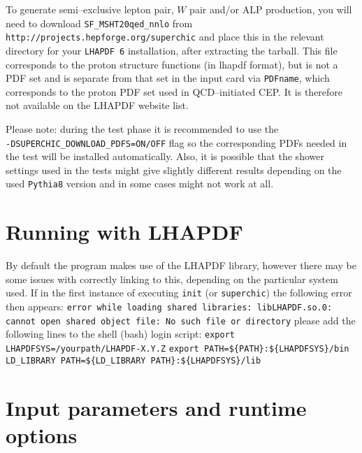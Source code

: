 \documentclass[12pt]{article}
\begin{document}
To generate semi--exclusive lepton pair, $W$ pair and/or ALP production, 
you will need to download \texttt{SF\_MSHT20qed\_nnlo} from 
\texttt{http://projects.hepforge.org/superchic} and place this in the 
relevant directory for your \texttt{LHAPDF 6} installation, after 
extracting the tarball. This file corresponds to the proton structure 
functions (in lhapdf format), but is not a PDF set and is separate from 
that set in the input card via \texttt{PDFname}, which corresponds to 
the proton PDF set used in QCD--initiated CEP. It is therefore not 
available on the LHAPDF website list.

Please note: during the test phase it is recommended to use the \\ \texttt{-DSUPERCHIC\_DOWNLOAD\_PDFS=ON/OFF} flag so the 
corresponding PDFs needed in the test will be installed automatically. Also, it is possible that the shower settings used in the tests 
might give slightly different results depending on the used \texttt{Pythia8} version and in some cases might not work at all.

\section{Running with LHAPDF}

By default the program makes use of the LHAPDF library, however there 
may be some issues with correctly linking to this, depending on the 
particular system used. 
If in the first instance of executing \texttt{init} (or
 \texttt{superchic}) the following error then appears:
\newline
\newline
\texttt{error while loading shared libraries: libLHAPDF.so.0: cannot 
open shared object file: No such file or directory}
\newline
\newline
please add the following lines to the shell (bash) login script:
\newline
\newline
\texttt{export LHAPDFSYS=/yourpath/LHAPDF-X.Y.Z}
\newline
\texttt{export PATH=\$\{PATH\}:\$\{LHAPDFSYS\}/bin}
\newline
\texttt{LD\_LIBRARY PATH=\$\{LD\_LIBRARY PATH\}:\$\{LHAPDFSYS\}/lib}


\section{Input parameters and runtime options}
\end{document}

